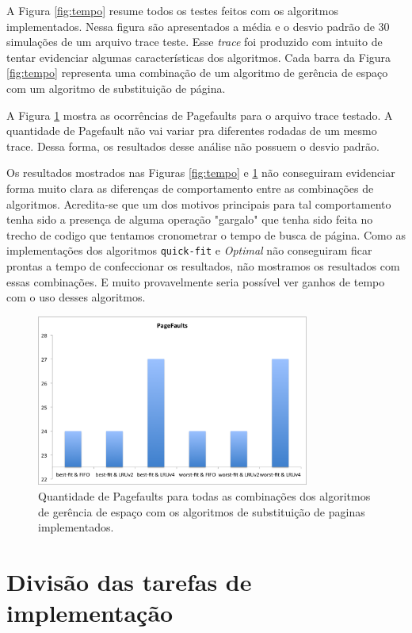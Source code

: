 \documentclass[12pt,a4paper]{article}
\begin{document}
A Figura \ref{fig:tempo} resume todos os testes feitos com os algoritmos implementados. Nessa figura são apresentados a média e o desvio padrão de 30 simulações de um arquivo trace teste. Esse \textit{trace} foi produzido com intuito de tentar evidenciar algumas características dos algoritmos. Cada barra da Figura \ref{fig:tempo} representa uma combinação de um algoritmo de gerência de espaço com um algoritmo de substituição de página. 

A Figura \ref{fig:pagefault} mostra as ocorrências de Pagefaults para o arquivo trace testado. A quantidade de Pagefault não vai variar pra diferentes rodadas de um mesmo trace. Dessa forma, os resultados desse análise não possuem o desvio padrão.

Os resultados mostrados nas Figuras \ref{fig:tempo} e \ref{fig:pagefault} não conseguiram evidenciar forma muito clara as diferenças de comportamento entre as combinações de algoritmos. Acredita-se que um dos motivos principais para tal comportamento tenha sido a presença de alguma operação "gargalo" que tenha sido feita no trecho de codigo que tentamos cronometrar o tempo de busca de página. Como as implementações dos algoritmos \texttt{quick-fit} e \textit{Optimal} não conseguiram ficar prontas a tempo de confeccionar os resultados, não mostramos os resultados com essas combinações. E muito provavelmente seria possível ver ganhos de tempo com o uso desses algoritmos.  

\begin{figure}[htpb]
\centering
\includegraphics[width=0.8\textwidth]{fig/pagefault_ep3.png}
\caption{Quantidade de Pagefaults para todas as combinações dos algoritmos de gerência de espaço com os algoritmos de substituição de paginas implementados.}
\label{fig:pagefault}
\end{figure}

\section{Divisão das tarefas de implementação}
\end{document}
